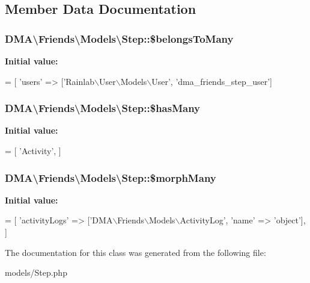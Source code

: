 \subsection{Member Data Documentation}
\hypertarget{classDMA_1_1Friends_1_1Models_1_1Step_ac0b25912a2d3c62aa72e15e443648d81}{
\subsubsection[{\$belongs\-To\-Many}]{\setlength{\rightskip}{0pt plus 5cm}D\-M\-A\textbackslash{}\-Friends\textbackslash{}\-Models\textbackslash{}\-Step\-::\$belongs\-To\-Many}}\label{classDMA_1_1Friends_1_1Models_1_1Step_ac0b25912a2d3c62aa72e15e443648d81}
{\bfseries Initial value\-:}
\begin{DoxyCode}
= [
        \textcolor{stringliteral}{'users'} => [\textcolor{stringliteral}{'Rainlab\(\backslash\)User\(\backslash\)Models\(\backslash\)User'}, \textcolor{stringliteral}{'dma\_friends\_step\_user'}]
\end{DoxyCode}
\hypertarget{classDMA_1_1Friends_1_1Models_1_1Step_a647b3d45c63c48faab1ad4b33b9be8a0}{
\subsubsection[{\$has\-Many}]{\setlength{\rightskip}{0pt plus 5cm}D\-M\-A\textbackslash{}\-Friends\textbackslash{}\-Models\textbackslash{}\-Step\-::\$has\-Many}}\label{classDMA_1_1Friends_1_1Models_1_1Step_a647b3d45c63c48faab1ad4b33b9be8a0}
{\bfseries Initial value\-:}
\begin{DoxyCode}
= [
        \textcolor{stringliteral}{'Activity'},
    ]
\end{DoxyCode}
\hypertarget{classDMA_1_1Friends_1_1Models_1_1Step_ae1aa1ff83758491327ea35861828b233}{
\subsubsection[{\$morph\-Many}]{\setlength{\rightskip}{0pt plus 5cm}D\-M\-A\textbackslash{}\-Friends\textbackslash{}\-Models\textbackslash{}\-Step\-::\$morph\-Many}}\label{classDMA_1_1Friends_1_1Models_1_1Step_ae1aa1ff83758491327ea35861828b233}
{\bfseries Initial value\-:}
\begin{DoxyCode}
= [ 
        \textcolor{stringliteral}{'activityLogs'}  => [\textcolor{stringliteral}{'DMA\(\backslash\)Friends\(\backslash\)Models\(\backslash\)ActivityLog'}, \textcolor{stringliteral}{'name'} => \textcolor{stringliteral}{'object'}],
    ]
\end{DoxyCode}


The documentation for this class was generated from the following file\-:\begin{DoxyCompactItemize}
\item 
models/Step.\-php\end{DoxyCompactItemize}
